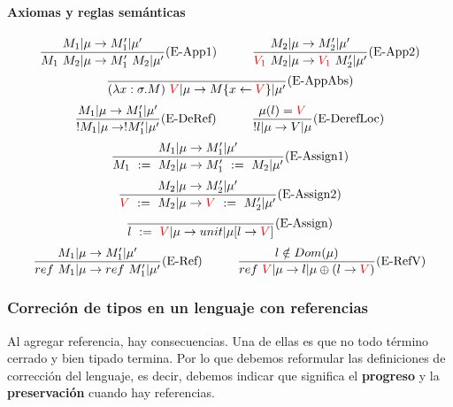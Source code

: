 \paragraph{Axiomas y reglas semánticas}
\begin{equation*}
	\frac{M_1|\mu\to M'_1|\mu'}{M_1~M_2|\mu\to M'_1~M_2|\mu'}(\text{E-App1})\hspace*{1cm}\frac{M_2|\mu\to M'_2|\mu'}{\color{red}V_1\color{black}~M_2|\mu\to \color{red}V_1\color{black}~M'_2|\mu'}(\text{E-App2})
\end{equation*}
\vspace*{5mm}
\begin{equation*}
	\frac{}{(\lambda x: \sigma . M)~\color{red}V\color{black}|\mu\to M\{x\leftarrow\color{red}V\color{black}\}|\mu'}(\text{E-AppAbs})
\end{equation*}
\vspace*{5mm}
\begin{equation*}
	\frac{M_1|\mu\to M'_1|\mu'}{!M_1|\mu\to !M_1'|\mu'}(\text{E-DeRef})\hspace*{1cm}
	\frac{\mu(l) = \color{red}V\color{black}}{!l|\mu\to V|\mu}(\text{E-DerefLoc})
\end{equation*}
\vspace*{5mm}
\begin{equation*}
	\frac{M_1|\mu\to M'_1|\mu'}{M_1~:=~M_2|\mu\to M'_1~:=~M_2|\mu'}(\text{E-Assign1})
\end{equation*}
\vspace*{5mm}
\begin{equation*}
	\frac{M_2|\mu\to M'_2|\mu'}{\color{red}V\color{black}~:=~M_2|\mu\to \color{red}V\color{black}~:=~M'_2|\mu'}(\text{E-Assign2})
\end{equation*}
\vspace*{5mm}
\begin{equation*}
	\frac{}{l~:=~\color{red}V\color{black}|\mu\to unit|\mu[l\to \color{red}V\color{black}]}(\text{E-Assign})
\end{equation*}
\vspace*{5mm}
\begin{equation*}
	\frac{M_1|\mu\to M'_1|\mu'}{ref~M_1|\mu\to ref~M'_1|\mu'}(\text{E-Ref})\hspace*{1cm}
	\frac{l\notin Dom(\mu)}{ref~\color{red}V\color{black}|\mu\to l|\mu\oplus(l\to \color{red}V\color{black})}(\text{E-RefV})
\end{equation*}

\subsubsection{Correción de tipos en un lenguaje con referencias}
Al agregar referencia, hay consecuencias. Una de ellas es que no todo término cerrado y bien tipado termina. Por lo que debemos reformular las definiciones de corrección del lenguaje, es decir, debemos indicar que significa el \textbf{progreso} y la \textbf{preservación} cuando hay referencias.

